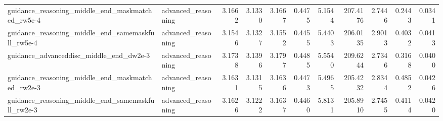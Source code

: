 \begin{tabular}{llrrrrrrrrr}
guidance_reasoning_middle_end_maskmatched_rw5e-4 & advanced_reasoning & 3.1662 & 3.1330 & 3.1667 & 0.4475 & 5.1544 & 207.4176 & 2.7446 & 0.2443 & 0.0341 \\
guidance_reasoning_middle_end_samemaskfull_rw5e-4 & advanced_reasoning & 3.1546 & 3.1327 & 3.1552 & 0.4455 & 5.4403 & 206.0135 & 2.9013 & 0.4032 & 0.0413 \\
guidance_advanceddisc_middle_end_dw2e-3 & advanced_reasoning & 3.1738 & 3.1396 & 3.1797 & 0.4485 & 5.5540 & 209.6244 & 2.7346 & 0.3168 & 0.0400 \\
guidance_reasoning_middle_end_maskmatched_rw2e-3 & advanced_reasoning & 3.1631 & 3.1315 & 3.1636 & 0.4473 & 5.4965 & 205.4232 & 2.8344 & 0.4852 & 0.0426 \\
guidance_reasoning_middle_end_samemaskfull_rw2e-3 & advanced_reasoning & 3.1626 & 3.1222 & 3.1637 & 0.4460 & 5.8131 & 205.8910 & 2.7455 & 0.4114 & 0.0420 \\
\bottomrule
\end{tabular}
